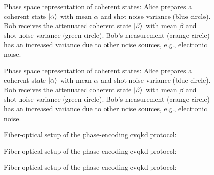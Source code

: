 \begin{figure}[htb]
	\centering
	
	\caption{Phase space representation of coherent states: Alice prepares a coherent state $\ket{\alpha}$ with mean $\alpha$ and shot noise variance (blue circle). Bob receives the attenuated coherent state $\ket{\beta}$ with mean $\beta$ and shot noise variance (green circle). Bob's measurement (orange circle) has an increased variance due to other noise sources, e.g., electronic noise.}
\end{figure}

\begin{figure}[htb]
	\centering
	
	\caption{Phase space representation of coherent states: Alice prepares a coherent state $\ket{\alpha}$ with mean $\alpha$ and shot noise variance (blue circle). Bob receives the attenuated coherent state $\ket{\beta}$ with mean $\beta$ and shot noise variance (green circle). Bob's measurement (orange circle) has an increased variance due to other noise sources, e.g., electronic noise.}
\end{figure}

\begin{figure}[htb]
	\centering
	
	\caption{Fiber-optical setup of the phase-encoding \gls{cvqkd} protocol:}
\end{figure}

\begin{figure}[htb]
	\centering
	
	\caption{Fiber-optical setup of the phase-encoding \gls{cvqkd} protocol:}
\end{figure}

\begin{figure}[htb]
	\centering
	
	\caption{Fiber-optical setup of the phase-encoding \gls{cvqkd} protocol:}
\end{figure}

